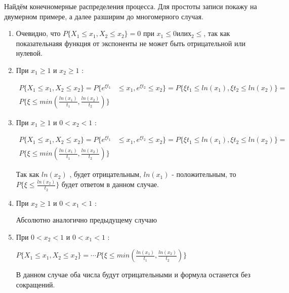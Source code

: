 \documentclass[a4paper,12pt]{article}
\begin{document}
Найдём конечномерные распределения процесса. Для простоты записи покажу на двумерном примере, а далее разширим до многомерного случая.

\begin{enumerate}[\Sun]
	\item Очевидно, что $ P\{X_1 \le x_1, X_2 \le x_2\} = 0 $ при $ x_1 \le 0 или х_2 \le $, так как показательнаяя функция от экспоненты не может быть отрицательной или нулевой.
	
	\item При $ x_1 \ge 1 \text{ и } x_2 \ge 1 $ :

	\begin{equation}
	\begin{aligned}
	 P\{X_1 \le x_1, X_2 \le x_2\}=  P\{e^{\xi t_1}& \le x_1, e^{\xi t_2} \le x_2\} = P\{\xi t_1 \le ln(x_1), \xi t_2 \le ln(x_2)\} =\\ P\{ \xi \le min\left(\frac{ln(x_1)}{t_1}, \frac{ln(x_2)}{t_2}\right) \} 
	 \end{aligned}
	 \end{equation}
	 
	 \item При $ x_1 \ge 1 \text{ и } 0 < x_2 < 1 $ :
	 
 	\begin{equation}
 	\begin{aligned}
	 P\{X_1 \le x_1, X_2 \le x_2\}=  P\{e^{\xi t_1}& \le x_1, e^{\xi t_2} \le x_2\} = P\{\xi t_1 \le ln(x_1), \xi t_2 \le ln(x_2)\} = \\  P\{ \xi \le min\left(\frac{ln(x_1)}{t_1}, \frac{ln(x_2)}{t_2}\right) \} 
	 \end{aligned}
	 \end{equation}
	 
	 Так как $ ln(x_2) $ , будет отрицательным, $ ln(x_1) $ - положительным, то $  P\{ \xi \le \frac{ln(x_2)}{t_2} \} $ будет ответом в данном случае. 
	 
	 \item При $ x_2 \ge 1 \text{ и } 0 < x_1 < 1 $ :
	 
	 Абсолютно аналогично предыдущему случаю
	 
	 \item При $ 0 < x_2 < 1 \text{ и } 0 < x_1 < 1 $ :
	 
	$  P\{X_1 \le x_1, X_2 \le x_2\}= \cdots  P\{ \xi \le min\left(\frac{ln(x_1)}{t_1}, \frac{ln(x_2)}{t_2}\right) \}  $
	
	В данном случае оба числа будут отрицательными и формула останется без сокращений.
	

\end{enumerate}
\end{document}
